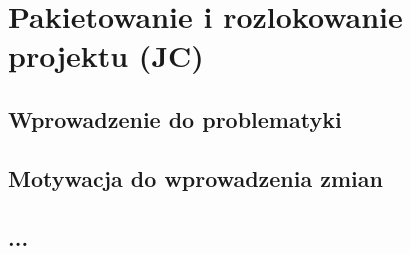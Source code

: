\clearpage
\section{Pakietowanie i rozlokowanie projektu (JC)}
\label{ch:packages}



\subsection{Wprowadzenie do problematyki}

\subsection{Motywacja do wprowadzenia zmian}

\subsection{...}